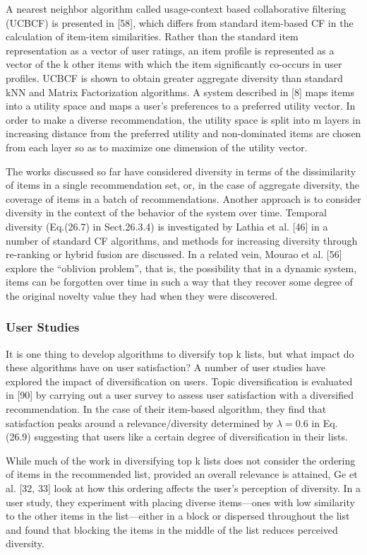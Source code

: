 A nearest neighbor algorithm called usage-context based collaborative filtering (UCBCF) is presented in [58], which differs from standard item-based CF in the calculation of item-item similarities. Rather than the standard item representation as a vector of user ratings, an item profile is represented as a vector of the k other items with which the item significantly co-occurs in user profiles. UCBCF is shown to obtain greater aggregate diversity than standard kNN and Matrix Factorization algorithms. A system described in [8] maps items into a utility space and maps a user’s preferences to a preferred utility vector. In order to make a diverse recommendation, the utility space is split into m layers in increasing distance from the preferred utility and non-dominated items are chosen from each layer so as to maximize one dimension of the utility vector.

The works discussed so far have considered diversity in terms of the dissimilarity of items in a single recommendation set, or, in the case of aggregate diversity, the coverage of items in a batch of recommendations. Another approach is to consider diversity in the context of the behavior of the system over time. Temporal diversity (Eq.(26.7) in Sect.26.3.4) is investigated by Lathia et al. [46] in a number of standard CF algorithms, and methods for increasing diversity through re-ranking or hybrid fusion are discussed. In a related vein, Mourao et al. [56] explore the “oblivion problem”, that is, the possibility that in a dynamic system, items can be forgotten over time in such a way that they recover some degree of the original novelty value they had when they were discovered.

\subsubsection{User Studies}

It is one thing to develop algorithms to diversify top k lists, but what impact do these algorithms have on user satisfaction? A number of user studies have explored the impact of diversification on users. Topic diversification is evaluated in [90] by carrying out a user survey to assess user satisfaction with a diversified recommendation. In the case of their item-based algorithm, they find that satisfaction peaks around a relevance/diversity determined by $\lambda = 0.6$ in Eq. (26.9) suggesting that users like a certain degree of diversification in their lists.

While much of the work in diversifying top k lists does not consider the ordering of items in the recommended list, provided an overall relevance is attained, Ge et al. [32, 33] look at how this ordering affects the user’s perception of diversity. In a user study, they experiment with placing diverse items—ones with low similarity to the other items in the list—either in a block or dispersed throughout the list and found that blocking the items in the middle of the list reduces perceived diversity.

